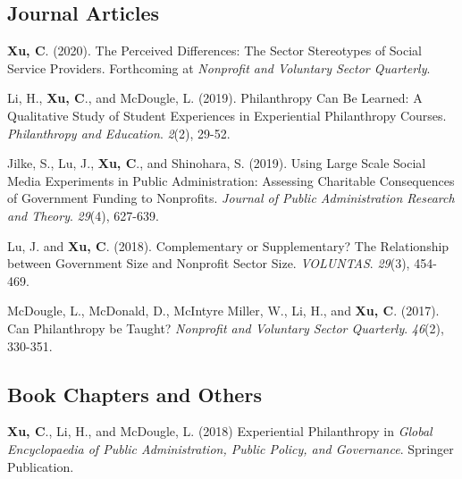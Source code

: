 \documentclass[letterpaper]{article}
\renewenvironment{itemize}{
  \begin{list}{}{
    \setlength{\leftmargin}{1.5em}
  }
}{
  \end{list}
}
\begin{document}
\subsection*{Journal Articles}

\begin{itemize}
	
\item \textbf{Xu, C}. (2020). The Perceived Differences: The Sector Stereotypes of Social Service Providers. Forthcoming at {\it Nonprofit and Voluntary Sector Quarterly}.	

\item Li, H., \textbf{Xu, C}., and McDougle, L. (2019). Philanthropy Can Be Learned: A Qualitative Study of Student Experiences in Experiential Philanthropy Courses. {\it Philanthropy and Education}. {\it 2}(2), 29-52.

\item Jilke, S., Lu, J., \textbf{Xu, C}., and Shinohara, S. (2019). Using Large Scale Social Media Experiments in Public Administration: Assessing Charitable Consequences of Government Funding to Nonprofits. {\it Journal of Public Administration Research and Theory}. {\it 29}(4), 627-639.

\item Lu, J. and \textbf{Xu, C}. (2018). Complementary or Supplementary? The Relationship between Government Size and Nonprofit Sector Size. {\it VOLUNTAS}. {\it 29}(3), 454-469.

\item McDougle, L., McDonald, D., McIntyre Miller, W., Li, H., and \textbf{Xu, C}. (2017). Can Philanthropy be Taught? {\it Nonprofit and Voluntary Sector Quarterly}. {\it 46}(2), 330-351. 

\end{itemize}

\subsection*{Book Chapters and Others}
\begin{itemize}
	
\item \textbf{Xu, C}., Li, H., and McDougle, L. (2018) Experiential Philanthropy in {\it Global Encyclopaedia of Public Administration, Public Policy, and Governance}. Springer Publication.

\end{itemize}
\end{document}
